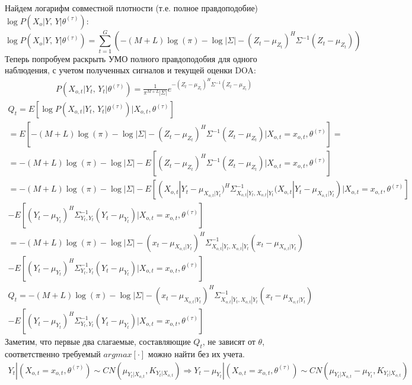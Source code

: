 \documentclass[11pt]{article}
\begin{document}
Найдем логарифм совместной плотности (т.е. полное правдоподобие) $\log P(X_o|Y, \, Y|\theta^{(\tau)})$:
\begin{equation*}
\log P(X_o|Y, \, Y|\theta^{(\tau)}) = \sum_{t=1}^G \left(-(M+L)\log(\pi)-\log|\Sigma|-(Z_t-\mu_{Z_t})^H\Sigma^{-1}(Z_t-\mu_{Z_t})\right)
\end{equation*}
Теперь попробуем раскрыть УМО полного правдоподобия для одного наблюдения, с учетом полученных сигналов и текущей оценки DOA:
\begin{gather}
P(X_{o,t}|Y_t, \, Y_t|\theta^{(\tau)}) = \frac{1}{\pi^{M+L}|\Sigma|}e^{-(Z_t-\mu_{Z_t})^H\Sigma^{-1}(Z_t-\mu_{Z_t})}
\end{gather}
\begin{gather*}
Q_t = E[\log P(X_{o,t}|Y_t, \, Y_t|\theta^{(\tau)})|X_{o,t}, \theta^{(\tau)}] \\ = E[-(M+L)\log(\pi)-\log|\Sigma|-(Z_t-\mu_{Z_t})^H\Sigma^{-1}(Z_t-\mu_{Z_t})|X_{o,t}=x_{o,t}, \theta^{(\tau)}] = \\
=-(M+L)\log(\pi)-\log|\Sigma| - E[(Z_t-\mu_{Z_t})^H\Sigma^{-1}(Z_t-\mu_{Z_t})|X_{o,t}=x_{o,t}, \theta^{(\tau)}] \\
=-(M+L)\log(\pi)-\log|\Sigma|  -   E[(X_{o,t}|Y_t-\mu_{X_{o,t}|Y_t})^H\Sigma_{X_{o,t}|Y_t,X_{o,t}|Y_t}^{-1}(X_{o,t}|Y_t-\mu_{X_{o,t}|Y_t})|X_{o,t}=x_{o,t}, \theta^{(\tau)}] 
\\- E[(Y_t-\mu_{Y_t})^H\Sigma_{Y_t,Y_t}^{-1}(Y_t-\mu_{Y_t})|X_{o,t}=x_{o,t}, \theta^{(\tau)}] \\
=-(M+L)\log(\pi)-\log|\Sigma| - (x_t-\mu_{X_{o,t}|Y_t})^H\Sigma_{X_{o,t}|Y_t,X_{o,t}|Y_t}^{-1}(x_t-\mu_{X_{o,t}|Y_t})\\ - E[(Y_t-\mu_{Y_t})^H\Sigma_{Y_t,Y_t}^{-1}(Y_t-\mu_{Y_t})|X_{o,t}=x_{o,t},\theta^{(\tau)}] 
\end{gather*}
\begin{equation}
\begin{gathered}
Q_t = -(M+L)\log(\pi)-\log|\Sigma| - (x_t-\mu_{X_{o,t}|Y_t})^H\Sigma_{X_{o,t}|Y_t,X_{o,t}|Y_t}^{-1}(x_t-\mu_{X_{o,t}|Y_t}) \\ - E[(Y_t-\mu_{Y_t})^H\Sigma_{Y_t,Y_t}^{-1}(Y_t-\mu_{Y_t})|X_{o,t}=x_{o,t},\theta^{(\tau)}] 
\end{gathered}
\end{equation}
Заметим, что первые два слагаемые, составляющие $Q_t$, не зависят от $\theta$, соответственно требуемый $argmax [\cdot]$ можно найти без их учета.
\begin{gather*}
Y_t|(X_{o,t}=x_{o,t}, \theta^{(\tau)}) \sim CN(\mu_{Y_t|X_{o,t}}, K_{Y_t|X_{o,t}}) \Rightarrow Y_t-\mu_{Y_t}|(X_{o,t}=x_{o,t}, \theta^{(\tau)}) \sim CN(\mu_{Y_t|X_{o,t}}-\mu_{Y_t}, K_{Y_t|X_{o,t}})
\end{gather*}
\end{document}
